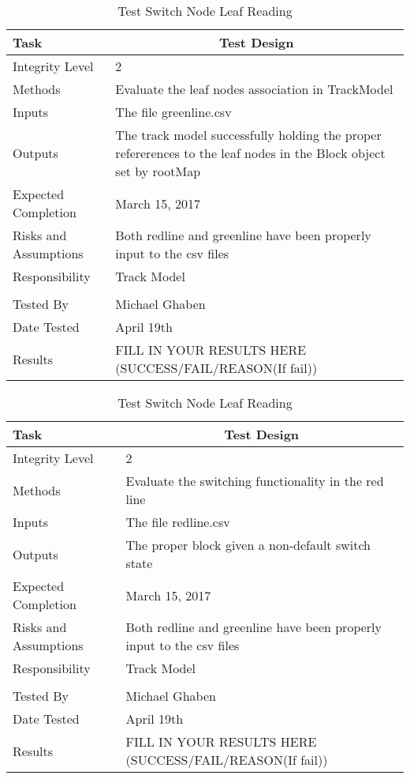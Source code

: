 \documentclass[]{article}
\begin{document}
\begin{table}[H]
	\centering
	\caption{Test Switch Node Leaf Reading}
	\begin{tabular}{|l|l|}
		\hline
		Task & \multicolumn{1}{c|}{Test Design} \\ \hline
		Integrity Level & 2 \\ \hline
		Methods & Evaluate the leaf nodes association in TrackModel\\ \hline
		Inputs &  The file greenline.csv \\ \hline
		Outputs &  \parbox[t]{10cm}{The track model successfully holding the proper refererences to the leaf nodes in the Block object set by rootMap}\\ \hline
		Expected Completion & March 15, 2017\\ \hline
		Risks and Assumptions & Both redline and greenline have been properly input to the csv files \\ \hline
		Responsibility & Track Model\\ \hline
		\\ \hline
		Tested By   &  Michael Ghaben\\	\hline
		Date Tested & \parbox[t]{10cm}{April 19th}\\ \hline
		Results & FILL IN YOUR RESULTS HERE (SUCCESS/FAIL/REASON(If fail))\\ \hline
	\end{tabular}
\end{table}

\begin{table}[H]
	\centering
	\caption{Test Switch Node Leaf Reading}
	\begin{tabular}{|l|l|}
		\hline
		Task & \multicolumn{1}{c|}{Test Design} \\ \hline
		Integrity Level & 2 \\ \hline
		Methods & Evaluate the switching functionality in the red line\\ \hline
		Inputs &  The file redline.csv \\ \hline
		Outputs &  The proper  block given a non-default switch state\\ \hline
		Expected Completion & March 15, 2017\\ \hline
		Risks and Assumptions & Both redline and greenline have been properly input to the csv files \\ \hline
		Responsibility & Track Model\\ \hline
		\\ \hline
		Tested By   &  Michael Ghaben\\	\hline
		Date Tested & \parbox[t]{10cm}{April 19th}\\ \hline
		Results & FILL IN YOUR RESULTS HERE (SUCCESS/FAIL/REASON(If fail))\\ \hline
	\end{tabular}
\end{table}
\end{document}
